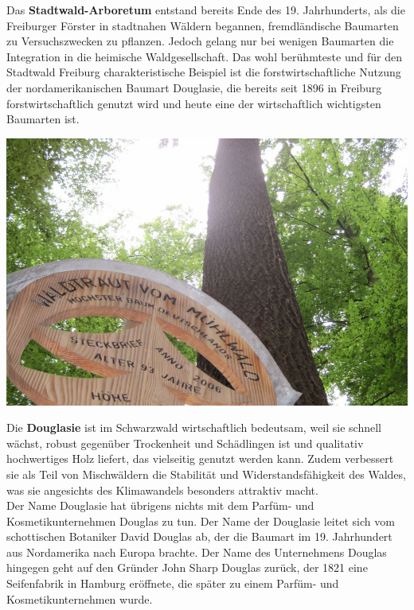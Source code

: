 \documentclass[landscape, a4paper]{article}
\newcommand\alert[1]{\textcolor{PrimaryColor}{\textbf{#1}}}
\begin{document}
\hfill%
\vrule width 0.01cm
\hfill%
\begin{minipage}[t]{0.31\textwidth}
	\setlength{\parskip}{0.25cm}
	Das \alert{Stadtwald-Arboretum} entstand bereits Ende des 19. Jahrhunderts, als die Freiburger Förster in stadtnahen Wäldern begannen, fremdländische Baumarten zu Versuchszwecken zu pflanzen. Jedoch gelang nur bei wenigen Baumarten die Integration in die heimische Waldgesellschaft. Das wohl berühmteste und für den Stadtwald Freiburg charakteristische Beispiel ist die forstwirtschaftliche Nutzung der nordamerikanischen Baumart Douglasie, die bereits seit 1896 in Freiburg forstwirtschaftlich genutzt wird und heute eine der wirtschaftlich wichtigsten Baumarten ist.

	\includegraphics[width=\linewidth]{./figures/waldraud.png}
	\setlength{\parskip}{0.25cm}

	Die \alert{Douglasie} ist im Schwarzwald wirtschaftlich bedeutsam, weil sie schnell wächst, robust gegenüber Trockenheit und Schädlingen ist und qualitativ hochwertiges Holz liefert, das vielseitig genutzt werden kann. Zudem verbessert sie als Teil von Mischwäldern die Stabilität und Widerstandsfähigkeit des Waldes, was sie angesichts des Klimawandels besonders attraktiv macht.\\
	Der Name Douglasie hat übrigens nichts mit dem Parfüm- und Kosmetikunternehmen Douglas zu tun. Der Name der Douglasie leitet sich vom schottischen Botaniker David Douglas ab, der die Baumart im 19. Jahrhundert aus Nordamerika nach Europa brachte. Der Name des Unternehmens Douglas hingegen geht auf den Gründer John Sharp Douglas zurück, der 1821 eine Seifenfabrik in Hamburg eröffnete, die später zu einem Parfüm- und Kosmetikunternehmen wurde.


\end{minipage}
\end{document}
